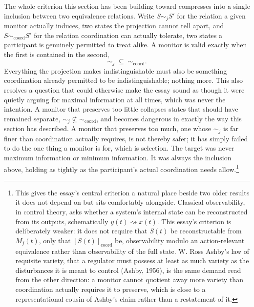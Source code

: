 \documentclass[12pt]{article}
\begin{document}
The whole criterion this section has been building toward compresses into a single inclusion between two equivalence relations. Write $S \sim_j S'$ for the relation a given monitor actually induces, two states the projection cannot tell apart, and $S \sim_{\mathrm{coord}} S'$ for the relation coordination can actually tolerate, two states a participant is genuinely permitted to treat alike. A monitor is valid exactly when the first is contained in the second,
\[
\boxed{\sim_j \; \subseteq \; \sim_{\mathrm{coord}}.}
\]
Everything the projection makes indistinguishable must also be something coordination already permitted to be indistinguishable; nothing more. This also resolves a question that could otherwise make the essay sound as though it were quietly arguing for maximal information at all times, which was never the intention. A monitor that preserves too little collapses states that should have remained separate, $\sim_j \not\subseteq \sim_{\mathrm{coord}}$, and becomes dangerous in exactly the way this section has described. A monitor that preserves too much, one whose $\sim_j$ is far finer than coordination actually requires, is not thereby safer; it has simply failed to do the one thing a monitor is for, which is selection. The target was never maximum information or minimum information. It was always the inclusion above, holding as tightly as the participant's actual coordination needs allow.\footnote{This gives the essay's central criterion a natural place beside two older results it does not depend on but sits comfortably alongside. Classical observability, in control theory, asks whether a system's internal state can be reconstructed from its outputs, schematically $y(t) \rightsquigarrow x(t)$. This essay's criterion is deliberately weaker: it does not require that $S(t)$ be reconstructable from $M_j(t)$, only that $[S(t)]_{\mathrm{coord}}$ be, observability modulo an action-relevant equivalence rather than observability of the full state. W. Ross Ashby's law of requisite variety, that a regulator must possess at least as much variety as the disturbances it is meant to control (Ashby, 1956), is the same demand read from the other direction: a monitor cannot quotient away more variety than coordination actually requires it to preserve, which is close to a representational cousin of Ashby's claim rather than a restatement of it.}
\end{document}
